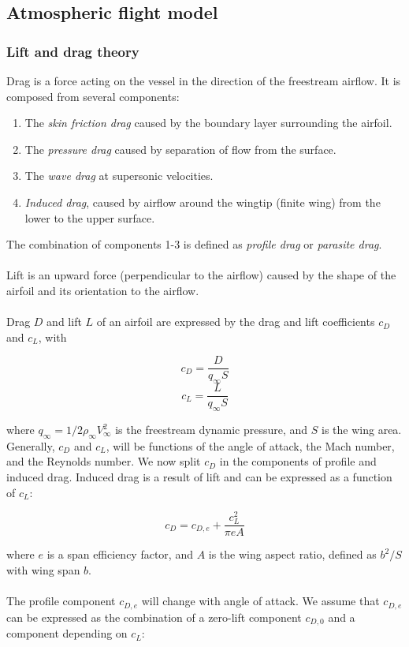 \documentclass[Orbiter Developer Manual.tex]{subfiles}
\begin{document}
\subsection{Atmospheric flight model}
\subsubsection{Lift and drag theory}
Drag is a force acting on the vessel in the direction of the freestream airflow. It is composed from several components:
\begin{enumerate}
\item The \textit{skin friction drag} caused by the boundary layer surrounding the airfoil.
\item The \textit{pressure drag} caused by separation of flow from the surface.
\item The \textit{wave drag} at supersonic velocities.
\item \textit{Induced drag}, caused by airflow around the wingtip (finite wing) from the lower to the upper surface.
\end{enumerate}
\noindent
The combination of components 1-3 is defined as \textit{profile drag} or \textit{parasite drag}.\\
\\
Lift is an upward force (perpendicular to the airflow) caused by the shape of the airfoil and its orientation to the airflow.\\
\\
Drag $D$ and lift $L$ of an airfoil are expressed by the drag and lift coefficients $c_{D}$ and $c_{L}$, with

\[ c_{D} = \frac{D}{q_{\infty} S} \]
\[ c_{L} = \frac{L}{q_{\infty} S} \]

\noindent
where $q_{\infty} = 1/2 \rho_{\infty} V^{2}_{\infty}$ is the freestream dynamic pressure, and $S$ is the wing area. Generally, $c_{D}$ and $c_{L}$, will be functions of the angle of attack, the Mach number, and the Reynolds number. We now split $c_{D}$ in the components of profile and induced drag. Induced drag is a result of lift and can be expressed as a function of $c_{L}$:

\[ c_{D} = c_{D,e} + \frac{c_{L}^{2}}{\pi eA} \]

\noindent
where $e$ is a span efficiency factor, and $A$ is the wing aspect ratio, defined as $b^{2}/S$ with wing span $b$.\\
\\
The profile component $c_{D,e}$ will change with angle of attack. We assume that $c_{D,e}$ can be expressed as the combination of a zero-lift component $c_{D,0}$ and a component depending on $c_{L}$:
\end{document}
